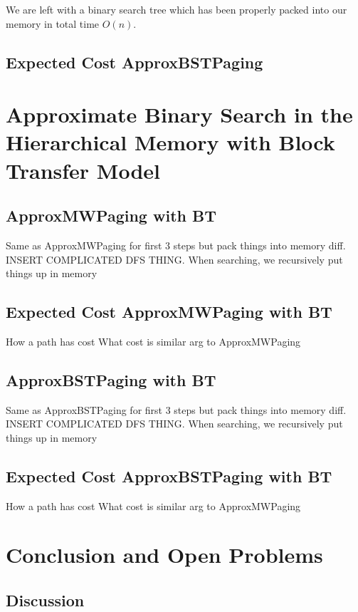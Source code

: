 \documentclass[letterpaper,12pt,titlepage,oneside,final]{book}
\theoremstyle{plain}
\begin{document}
We are left with a binary search tree which has been properly packed into our memory in total time $O(n)$.


\section{Expected Cost ApproxBSTPaging}


\chapter{Approximate Binary Search in the Hierarchical Memory with Block Transfer Model}

\section{ApproxMWPaging with BT}
Same as ApproxMWPaging for first 3 steps but pack things into memory diff. INSERT COMPLICATED DFS THING.
When searching, we recursively put things up in memory 

\section{Expected Cost ApproxMWPaging with BT}

How a path has cost
What cost is
similar arg to ApproxMWPaging


\section{ApproxBSTPaging with BT}
Same as ApproxBSTPaging for first 3 steps but pack things into memory diff. INSERT COMPLICATED DFS THING.
When searching, we recursively put things up in memory


\section{Expected Cost ApproxBSTPaging with BT}
How a path has cost
What cost is
similar arg to ApproxMWPaging

\chapter{Conclusion and Open Problems}

\section{Discussion}
\end{document}
